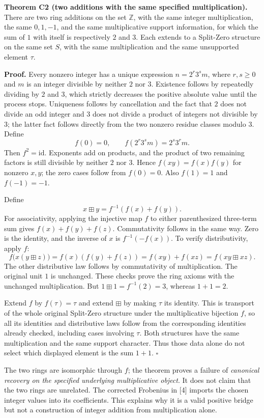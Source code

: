 \documentclass[
]{article}
\begin{document}
\textbf{Theorem C2 (two additions with the same specified
multiplication).} There are two ring additions on the set \(\mathbb Z\),
with the same integer multiplication, the same \(0,1,-1\), and the same
multiplicative support information, for which the sum of \(1\) with
itself is respectively \(2\) and \(3\). Each extends to a Split-Zero
structure on the same set \(S\), with the same multiplication and the
same unsupported element \(\tau\).

\textbf{Proof.} Every nonzero integer has a unique expression
\(n=2^r3^s m\), where \(r,s\ge0\) and \(m\) is an integer divisible by
neither \(2\) nor \(3\). Existence follows by repeatedly dividing by
\(2\) and \(3\), which strictly decreases the positive absolute value
until the process stops. Uniqueness follows by cancellation and the fact
that \(2\) does not divide an odd integer and \(3\) does not divide a
product of integers not divisible by \(3\); the latter fact follows
directly from the two nonzero residue classes modulo \(3\). Define \[
f(0)=0,\qquad f(2^r3^s m)=2^s3^r m.
\] Then \(f^2=\mathrm{id}\). Exponents add on products, and the product
of two remaining factors is still divisible by neither \(2\) nor \(3\).
Hence \(f(xy)=f(x)f(y)\) for nonzero \(x,y\); the zero cases follow from
\(f(0)=0\). Also \(f(1)=1\) and \(f(-1)=-1\).

Define \[
x\boxplus y=f^{-1}(f(x)+f(y)).
\tag{C8}
\] For associativity, applying the injective map \(f\) to either
parenthesized three-term sum gives \(f(x)+f(y)+f(z)\). Commutativity
follows in the same way. Zero is the identity, and the inverse of \(x\)
is \(f^{-1}(-f(x))\). To verify distributivity, apply \(f\): \[
f\bigl(x(y\boxplus z)\bigr)
=f(x)(f(y)+f(z))
=f(xy)+f(xz)
=f(xy\boxplus xz).
\] The other distributive law follows by commutativity of
multiplication. The original unit \(1\) is unchanged. These checks prove
the ring axioms with the unchanged multiplication. But
\(1\boxplus1=f^{-1}(2)=3\), whereas \(1+1=2\).

Extend \(f\) by \(f(\tau)=\tau\) and extend \(\boxplus\) by making
\(\tau\) its identity. This is transport of the whole original
Split-Zero structure under the multiplicative bijection \(f\), so all
its identities and distributive laws follow from the corresponding
identities already checked, including cases involving \(\tau\). Both
structures have the same multiplication and the same support character.
Thus those data alone do not select which displayed element is the sum
\(1+1\). \(\square\)

The two rings are isomorphic through \(f\); the theorem proves a failure
of \emph{canonical recovery on the specified underlying multiplicative
object}. It does not claim that the two rings are unrelated. The
corrected Frobenius in {[}4{]} imports the chosen integer values into
its coefficients. This explains why it is a valid positive bridge but
not a construction of integer addition from multiplication alone.
\end{document}
